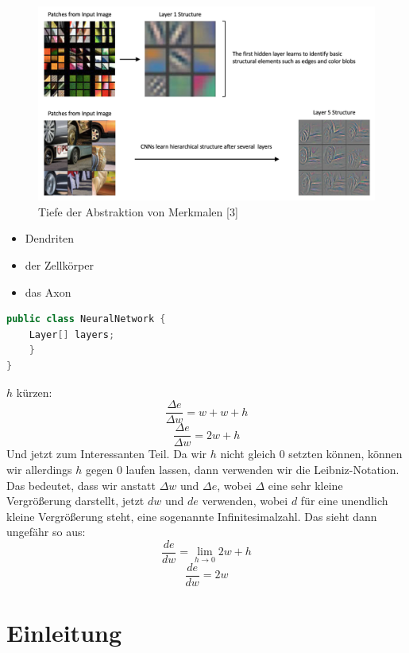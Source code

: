 \documentclass[12pt]{article}
\begin{document}
\begin{figure}[H]
\centering
\includegraphics[scale=0.27]{./Images/tensorflow-keras-cnn-hierarchical-structure.png}
\caption{Tiefe der Abstraktion von Merkmalen [3]}
\label{Tiefe der Abstraktion von Merkmalen [3]}
\end{figure}


\begin{itemize}
  \item Dendriten
  \item der Zellkörper
  \item das Axon
\end{itemize}

\begin{lstlisting}[language=Java]
public class NeuralNetwork {
    Layer[] layers;
    }
}
\end{lstlisting}

$h$ kürzen:
$$\frac{\Delta e}{\Delta w}=w+w+h$$
$$\frac{\Delta e}{\Delta w}=2w+h$$Und jetzt zum Interessanten Teil. Da wir $h$ nicht gleich 0 setzten können, können wir allerdings $h$ gegen 0 laufen lassen, dann verwenden wir die Leibniz-Notation. Das bedeutet, dass wir anstatt  $\Delta w$ und  $\Delta e$, wobei $\Delta$ eine sehr kleine Vergrößerung darstellt, jetzt $dw$ und $de$ verwenden, wobei $d$ für eine unendlich kleine Vergrößerung steht, eine sogenannte Infinitesimalzahl.
Das sieht dann ungefähr so aus:
$$\frac{de}{dw}=\lim_{h\to 0} 2w +h$$
$$\frac{de}{dw}=2w$$


\section{Einleitung}
\end{document}
